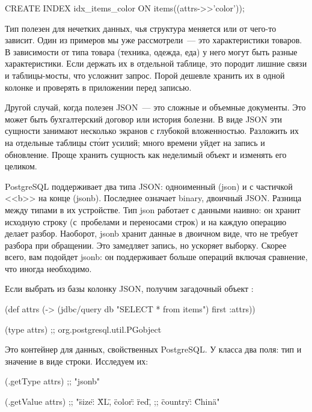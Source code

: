 \begin{english}
  \begin{sql}
CREATE INDEX idx_items_color
  ON items((attrs->>'color'));
  \end{sql}
\end{english}

Тип  полезен для нечетких данных, чья структура меняется или от чего-то зависит. Один из примеров мы уже рассмотрели~--- это характеристики товаров. В зависимости от типа товара (техника, одежда, еда) у него могут быть разные характеристики. Если держать их в отдельной таблице, это породит лишние связи и таблицы-мосты, что усложнит запрос. Порой дешевле хранить их в одной колонке  и проверять в приложении перед записью.

Другой случай, когда полезен JSON~--- это сложные и объемные документы. Это может быть бухгалтерский договор или история болезни. В виде JSON эти сущности занимают несколько экранов с глубокой вложенностью. Разложить их на отдельные таблицы ст\'{о}ит усилий; много времени уйдет на запись и обновление. Проще хранить сущность как неделимый объект и изменять его целиком.

PostgreSQL поддерживает два типа JSON: одноименный (json) и с частичкой <<b>> на конце (jsonb). Последнее означает binary, двоичный JSON. Разница между типами в их устройстве. Тип json работает с данными наивно: он хранит исходную строку (с~пробелами и переносами строк) и на каждую операцию делает разбор. Наоборот, jsonb хранит данные в двоичном виде, что не требует разбора при обращении. Это замедляет запись, но ускоряет выборку. Скорее всего, вам подойдет jsonb: он поддерживает больше операций включая сравнение, что иногда необходимо.

Если выбрать из базы колонку JSON, получим загадочный объект :

\begin{english}
  \begin{clojure}
(def attrs
  (-> (jdbc/query db "SELECT * from items")
      first
      :attrs))

(type attrs)
;; org.postgresql.util.PGobject
  \end{clojure}
\end{english}

Это контейнер для данных, свойственных PostgreSQL. У класса два поля: тип и значение в виде строки. Исследуем их:

\begin{english}
  \begin{clojure}
(.getType attrs)
;; "jsonb"

(.getValue attrs)
;; "{\"size\": \"XL\", \"color\": \"red\",
;;   \"country\": \"China\"}"
  \end{clojure}
\end{english}

